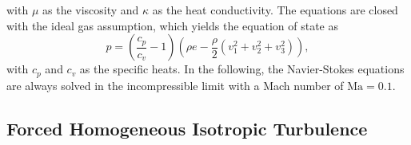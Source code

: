 with $\mu$ as the viscosity and $\kappa$ as the heat conductivity.
The equations are closed with the ideal gas assumption, which yields the equation of state as
\begin{equation}
  p = \left(\frac{c_p}{c_v}-1\right) \left(\rho e-\frac{\rho}{2}\left(v_1^2+v_2^2+v_3^2\right)\right),
\end{equation}
with $c_p$ and $c_v$ as the specific heats.
In the following, the Navier-Stokes equations are always solved in the incompressible limit with a Mach number of $\mathrm{Ma}=0.1$.



\subsection{Forced Homogeneous Isotropic Turbulence}

